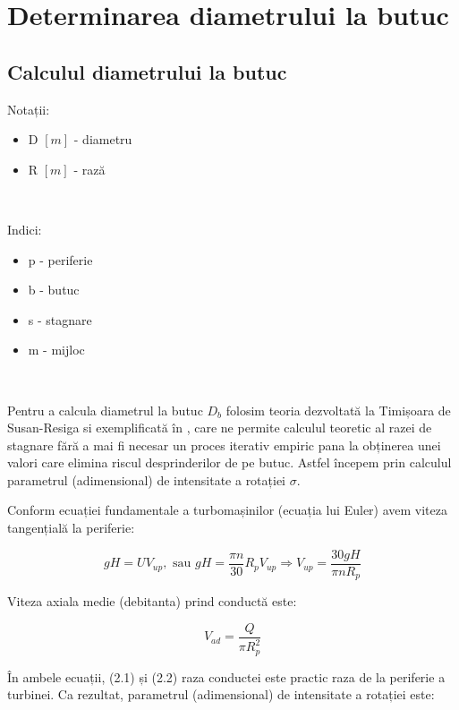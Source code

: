 \chapter{Determinarea diametrului la butuc}\label{chapter:butuc}

\section{Calculul diametrului la butuc}

Notații:
\begin{itemize}
    \item D $[m]$ - diametru
    \item R $[m]$ - rază
\end{itemize}

\

\noindent
Indici:
\begin{itemize}
    \item p - periferie
    \item b - butuc
    \item s - stagnare
    \item m - mijloc
\end{itemize}

\

Pentru a calcula diametrul la butuc $D_b$ folosim teoria dezvoltată la Timișoara de Susan-Resiga si exemplificată în \cite{susanhub}, care ne permite calculul teoretic al razei de stagnare fără a mai fi necesar un proces iterativ empiric pana la obținerea unei valori care elimina riscul desprinderilor de pe butuc. Astfel începem prin calculul parametrul (adimensional) de intensitate a rotației $\sigma$.

Conform ecuației fundamentale a turbomașinilor (ecuația lui Euler) avem viteza tangențială la periferie:

\begin{equation}
gH=UV_{up}, \text{ sau } gH=\frac{\pi n}{30} R_{p} V_{up} \Rightarrow V_{up}=\frac{30gH}{\pi n R_{p}}
\end{equation}

Viteza axiala medie (debitanta) prind conductă este:

\begin{equation}
V_{ad}=\frac{Q}{\pi R_{p}^2}
\end{equation}

În ambele ecuații, (2.1) și (2.2) raza conductei este practic raza de la periferie a turbinei. Ca rezultat, parametrul (adimensional) de intensitate a rotației este:

